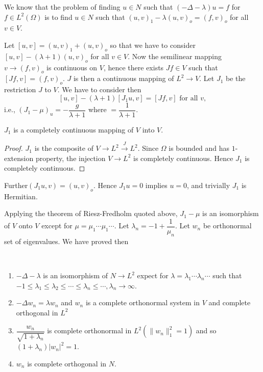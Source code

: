 We know that the problem of finding $u \in N$ such that $(-
\Delta - \lambda) u = f$ for $f \in L^2 (\Omega)$ is to find
$u \in N$ such that $(u, v)_1 - \lambda (u, v)_o = (f , v)_o $
for all $v \in V$. 

Let $[u,v]= (u,v)_1 + (u,v)_o$ so that we have to consider $[u,v]-
(\lambda + 1) (u,v)_o$ for all $v \in V$. Now the semilinear
mapping $v \to (f, v)_o$ is continuous on $V$, hence there exists $Jf
\in V$ such that $[Jf , v]= (f,v)_o$. $J$ is then a continuous
mapping of $L^2 \to V$. Let $J_1$ be the restriction $J$ to $V$. We
have to consider then 
$$
[u,v]- (\lambda + 1)[J_1 u,v] = [Jf , v] \text{ for all } v,
$$
i.e., \qquad $(J_1 - \mu )_u =- \dfrac{g}{\lambda + 1}$ where $=
\dfrac{1}{\lambda+1}$. 

\begin{lemma*} 
$J_1$ is a completely continuous mapping of $V$ into $V$.
\end{lemma*}

\begin{proof}
$J_1$ is the composite of $V \to L^2 \xrightarrow{J} L^2$. Since
  $\Omega$ is bounded and has $1$-extension property, the injection $V
  \to L^2$ is completely continuous. Hence $J_1$ is completely
  continuous. 
\end{proof}

Further\pageoriginale $(J_1 u, v) = (u, v)_o$. Hence $J_1 u =0$ implies $u = 0$, and
trivially $J_1$ is Hermitian. 

Applying the theorem of Riesz-Fredholm quoted above, $J_1 - \mu$ is an
isomorphism of $V$ onto $V$ except for $\mu = \mu_1 \cdots \mu_1
\cdots$. Let $\lambda _n =- 1+ \dfrac{1}{\mu_n}$. Let $w_n$ be
orthonormal set of eigenvalues. We have proved then 

\begin{theorem}\label{lec9:sec5:subsec3:thm5.3}%
  ~
  \begin{enumerate}[\rm (1)]
  \item $- \Delta - \lambda$ is an isomorphism of $N \to L^2$ expect for
    $\lambda = \lambda_1 \cdots \lambda_n \cdots$ such that $-1 \leq
    \lambda_1 \leq \lambda_2 \leq \cdots \leq \lambda_n \leq \cdots,
    \lambda_n \to \infty$. 
  \item $- \Delta w_n = \lambda w_n$ and $w_n$ is a complete orthonormal
    system in $V$ and complete orthogonal in $L^2$ 
  \item $\dfrac{w_n}{\sqrt{1+ \lambda_n}}$ is complete orthonormal in
    $L^2 (\| w_n \|^2_1 =1)$ and so $(1+ \lambda_n) |w_n|^2 = 1$. 
  \item $w_n$ is complete orthogonal in $N$. 
  \end{enumerate}
\end{theorem}
